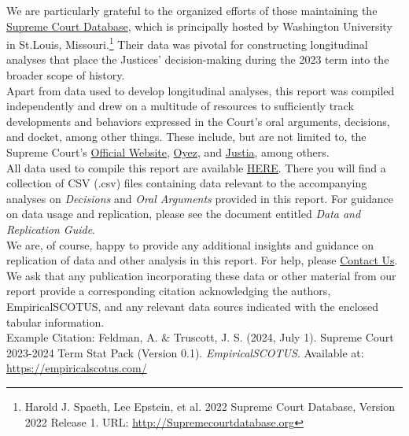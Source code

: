 
\noindent We are particularly grateful to the organized efforts of those maintaining the \textcolor{blue}{\href{http://scdb.wustl.edu/}{Supreme Court Database}}, which is principally hosted by Washington University in St.Louis, Missouri.\footnote{Harold J. Spaeth, Lee Epstein, et al. 2022 Supreme Court Database, Version 2022 Release 1. URL: \url{http://Supremecourtdatabase.org}} Their data was pivotal for constructing longitudinal analyses that place the Justices' decision-making during the 2023 term into the broader scope of history. \\

\noindent Apart from data used to develop longitudinal analyses, this report was compiled independently and drew on a multitude of resources to sufficiently track developments and behaviors expressed in the Court's oral arguments, decisions, and docket, among other things. These include, but are not limited to, the Supreme Court's \textcolor{blue}{\href{https://www.supremecourt.gov/}{Official Website}}, \textcolor{blue}{\href{https://www.oyez.org/}{Oyez}}, and \textcolor{blue}{\href{https://www.justia.com/}{Justia}}, among others. \\

\noindent All data used to compile this report are available \textcolor{blue}{\href{https://empiricalscotus.com/2023-stats/}{HERE}}. There you will find a collection of CSV (.csv) files containing data relevant to the accompanying analyses on \emph{Decisions} and \emph{Oral Arguments} provided in this report. For guidance on data usage and replication, please see the document entitled \emph{Data and Replication Guide}.  \\

\noindent We are, of course, happy to provide any additional insights and guidance on replication of data and other analysis in this report. For help, please \textcolor{blue}{\href{mailto:adam@feldmannet.com}{Contact Us}}. \\

\noindent We ask that any publication incorporating these data or other material from our report provide a corresponding citation acknowledging the authors, EmpiricalSCOTUS, and any relevant data sourcs indicated with the enclosed tabular information. \\

\noindent Example Citation: Feldman, A. \& Truscott, J. S. (2024, July 1). Supreme Court 2023-2024 Term Stat Pack (Version 0.1). \emph{EmpiricalSCOTUS}. Available at: \url{https://empiricalscotus.com/}

